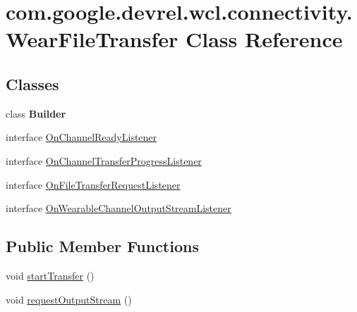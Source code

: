 \hypertarget{classcom_1_1google_1_1devrel_1_1wcl_1_1connectivity_1_1WearFileTransfer}{}\section{com.\+google.\+devrel.\+wcl.\+connectivity.\+Wear\+File\+Transfer Class Reference}
\label{classcom_1_1google_1_1devrel_1_1wcl_1_1connectivity_1_1WearFileTransfer}
\subsection*{Classes}
\begin{DoxyCompactItemize}
\item 
class {\bfseries Builder}
\item 
interface \hyperlink{interfacecom_1_1google_1_1devrel_1_1wcl_1_1connectivity_1_1WearFileTransfer_1_1OnChannelReadyListener}{On\+Channel\+Ready\+Listener}
\item 
interface \hyperlink{interfacecom_1_1google_1_1devrel_1_1wcl_1_1connectivity_1_1WearFileTransfer_1_1OnChannelTransferProgressListener}{On\+Channel\+Transfer\+Progress\+Listener}
\item 
interface \hyperlink{interfacecom_1_1google_1_1devrel_1_1wcl_1_1connectivity_1_1WearFileTransfer_1_1OnFileTransferRequestListener}{On\+File\+Transfer\+Request\+Listener}
\item 
interface \hyperlink{interfacecom_1_1google_1_1devrel_1_1wcl_1_1connectivity_1_1WearFileTransfer_1_1OnWearableChannelOutputStreamListener}{On\+Wearable\+Channel\+Output\+Stream\+Listener}
\end{DoxyCompactItemize}
\subsection*{Public Member Functions}
\begin{DoxyCompactItemize}
\item 
void \hyperlink{classcom_1_1google_1_1devrel_1_1wcl_1_1connectivity_1_1WearFileTransfer_abdabe46833a251759e295e4de2cc3c95}{start\+Transfer} ()
\item 
void \hyperlink{classcom_1_1google_1_1devrel_1_1wcl_1_1connectivity_1_1WearFileTransfer_aa99afe911b451e3689ad5163218337d3}{request\+Output\+Stream} ()
\end{DoxyCompactItemize}
